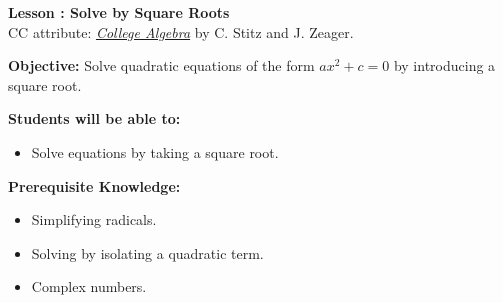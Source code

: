 \documentclass[12pt]{article}
\theoremstyle{definition}
\begin{document}
{\bf \large Lesson : Solve by Square Roots}\label{les:solve_by_square_roots}
\\ CC attribute: \href{http://www.stitz-zeager.com}{\it{College Algebra}} by C. Stitz and J. Zeager. 
\hfill \doclicenseImage[imagewidth=5em]\\
\par
{\bf Objective:} Solve quadratic equations of the form $ax^2+c=0$ by introducing a square root.\\
\par
{\bf Students will be able to:}
\begin{itemize}
	\item Solve equations by taking a square root.
\end{itemize}
{\bf Prerequisite Knowledge:}
\begin{itemize}
	\item Simplifying radicals.
	\item Solving by isolating a quadratic term.
	\item Complex numbers.
\end{itemize}
\hrulefill
\end{document}
